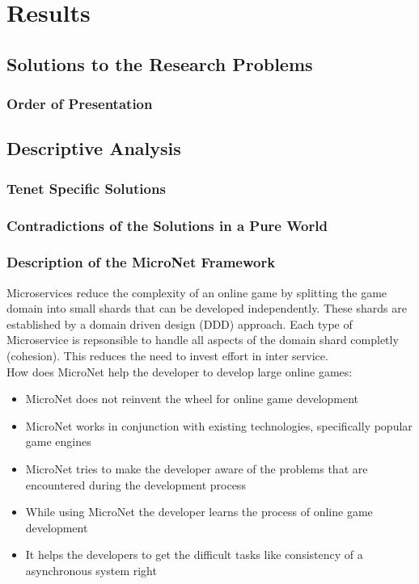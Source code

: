 \chapter{Results}

\section{Solutions to the Research Problems}
\subsection{Order of Presentation}

\section{Descriptive Analysis}

\subsection{\ms{} Tenet Specific Solutions}

\subsection{Contradictions of the Solutions in a Pure \ms{} World}

\subsection{Description of the MicroNet Framework}

Microservices reduce the complexity of an online game by splitting the game
domain into small shards that can be developed independently. These shards are
established by a domain driven design (DDD) approach. Each type of Microservice
is repsonsible to handle all aspects of the domain shard completly (cohesion).
This reduces the need to invest effort in inter service.\\

How does MicroNet help the developer to develop large online games:
\begin{itemize}
  \item MicroNet does not reinvent the wheel for online game development
  \item MicroNet works in conjunction with existing technologies, specifically popular game engines
  \item MicroNet tries to make the developer aware of the problems that are encountered during the development process
  \item While using MicroNet the developer learns the process of online game development 
  \item It helps the developers to get the difficult tasks like consistency of a
  asynchronous system right
\end{itemize}

